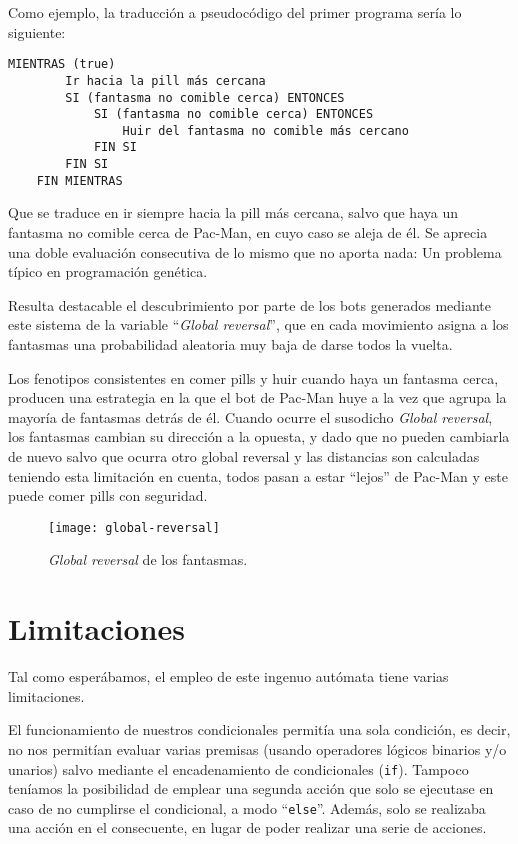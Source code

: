 Como ejemplo, la traducción a pseudocódigo del primer programa sería lo siguiente:
\begin{lstlisting}[frame=single, breaklines=no, basicstyle=\fontsize{10}{11}\ttfamily]
    MIENTRAS (true)
        Ir hacia la pill más cercana
        SI (fantasma no comible cerca) ENTONCES
            SI (fantasma no comible cerca) ENTONCES
                Huir del fantasma no comible más cercano
            FIN SI
        FIN SI
    FIN MIENTRAS
\end{lstlisting}

Que se traduce en ir siempre hacia la pill más cercana, salvo que haya un fantasma no comible cerca de Pac-Man, en cuyo caso se aleja de él. Se aprecia una doble evaluación consecutiva de lo mismo que no aporta nada: Un problema típico en programación genética. 

\blankline

Resulta destacable el descubrimiento por parte de los bots generados mediante este sistema de la variable ``\textit{Global reversal}'', que en cada movimiento asigna a los fantasmas una probabilidad aleatoria muy baja de darse todos la vuelta.
 
Los fenotipos consistentes en comer pills y huir cuando haya un fantasma cerca, producen una estrategia en la que el bot de Pac-Man huye a la vez que agrupa la mayoría de fantasmas detrás de él. Cuando ocurre el susodicho \textit{Global reversal}, los fantasmas cambian su dirección a la opuesta, y dado que no pueden cambiarla de nuevo salvo que ocurra otro global reversal y las distancias son calculadas teniendo esta limitación en cuenta, todos pasan a estar ``lejos'' de Pac-Man y este puede comer pills con seguridad.
\begin{figure}[H]
\centering
\texttt{[image: global-reversal]}
\caption{\textit{Global reversal} de los fantasmas.}
\end{figure}

\section{Limitaciones}
Tal como esperábamos, el empleo de este ingenuo autómata tiene varias limitaciones.
 
El funcionamiento de nuestros condicionales permitía una sola condición, es decir, no nos permitían evaluar varias premisas (usando operadores lógicos binarios y/o unarios) salvo mediante el encadenamiento de condicionales (\texttt{if}). 
Tampoco teníamos la posibilidad de emplear una segunda acción que solo se ejecutase en caso de no cumplirse el condicional, a modo ``\texttt{else}''. Además, solo se realizaba una acción en el consecuente, en lugar de poder realizar una serie de acciones. 
 
